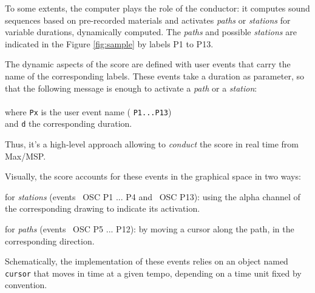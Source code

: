 \documentclass{article}
\newcommand{\OSC}[1]	{{\fontsize{8.5pt}{8pt} \selectfont\texttt{#1}}}
\newcommand{\tab}{\hspace*{4mm}}
\let\olditemize\itemize
\let\oldenditemize\enditemize
\renewenvironment{itemize} 	{\olditemize \renewcommand{\labelitemi}{$\bullet$} \setlength{\itemsep}{0mm}}{\oldenditemize}
\begin{document}
To some extents, the computer plays the role of
the conductor: it computes sound sequences based on pre-recorded materials and activates \emph{paths} or \emph{stations} for variable durations, dynamically computed. The \emph{paths} and possible \emph{stations} are indicated in the Figure \ref{fig:sample} by
 labels P1 to P13.

The dynamic aspects of the score are defined with user events that carry the name of the corresponding labels. These events take a duration as parameter, so that the following message is enough to activate a \emph{path} or a \emph{station}:\\
\tab \tab \OSC{/ITL/scene Px d} \\
where \OSC{Px} is the user event name (\OSC{P1...P13})\\
 and \OSC{d} the corresponding duration. 
 
Thus, it's a high-level approach 
allowing to \emph{conduct} the score in real time 
from Max/MSP.

Visually, the score accounts for these events in 
the graphical space in two ways:
\begin{itemize}
\item for \emph{stations} (events \ OSC {P1 ... P4} and \ OSC {P13}): using the alpha channel of the corresponding 
drawing to indicate its activation.
\item for \emph{paths} (events \ OSC {P5 ... P12}): by moving a cursor along the path, in the corresponding direction.
\end{itemize}

Schematically, the implementation of these events relies on an object named \OSC{cursor} that moves in time at a given tempo, depending on a time unit fixed by convention.
\end{document}

